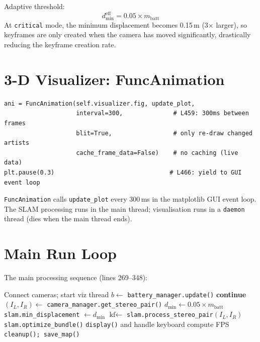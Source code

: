 \documentclass[12pt,a4paper,twoside]{report}
\theoremstyle{definition}
\newcommand{\code}[1]{\texttt{#1}}
\begin{document}
Adaptive threshold:
\[
  d_{\min}^{\text{eff}} = 0.05 \times m_{\text{batt}}
\]
At \code{critical} mode, the minimum displacement becomes 0.15\,m (3$\times$ larger),
so keyframes are only created when the camera has moved significantly, drastically
reducing the keyframe creation rate.

\section{3-D Visualizer: FuncAnimation}

\begin{lstlisting}
ani = FuncAnimation(self.visualizer.fig, update_plot,
                    interval=300,              # L459: 300ms between frames
                    blit=True,                 # only re-draw changed artists
                    cache_frame_data=False)    # no caching (live data)
plt.pause(0.3)                                # L466: yield to GUI event loop
\end{lstlisting}

\noindent \code{FuncAnimation} calls \code{update\_plot} every 300\,ms in the
matplotlib GUI event loop. The SLAM processing runs in the main thread;
visualisation runs in a \code{daemon} thread (dies when the main thread ends).

\section{Main Run Loop}

The main processing sequence (lines 269--348):

\begin{algorithm}[H]
\caption{IntegratedStereoSLAMSystem.run()}\label{alg:main}
\begin{algorithmic}[1]
\State Connect cameras; start viz thread
  \State $b \leftarrow$ \texttt{battery\_manager.update()}
    \State \textbf{continue}                
  \EndIf
  \State $(I_L, I_R) \leftarrow$ \texttt{camera\_manager.get\_stereo\_pair()}
  \State $d_{\min} \leftarrow 0.05 \times m_\text{batt}$   
  \State \texttt{slam.min\_displacement} $\leftarrow d_{\min}$
  \State $\text{kf} \leftarrow$ \texttt{slam.process\_stereo\_pair}$(I_L, I_R)$
    \State \texttt{slam.optimize\_bundle()}
  \EndIf
  \State \texttt{display()} and handle keyboard
  \State compute FPS
\EndWhile
\State \texttt{cleanup(); save\_map()}
\end{algorithmic}
\end{algorithm}
\end{document}

